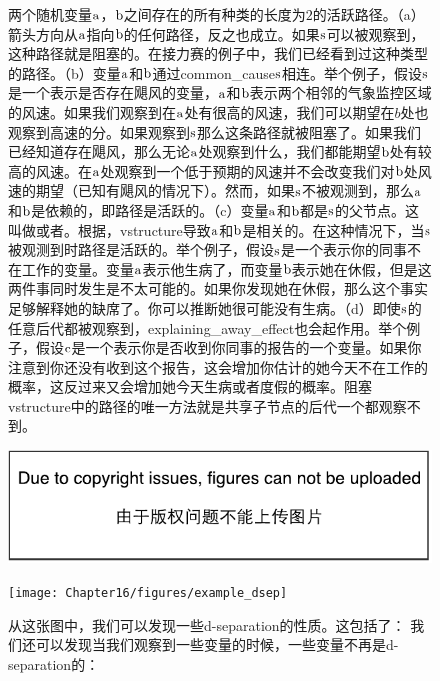 \begin{figure}[!htb]
	\caption{两个随机变量$\mathrm{a}$，$\mathrm{b}$之间存在的所有种类的长度为$2$的活跃路径。（a）箭头方向从$\mathrm{a}$指向$\mathrm{b}$的任何路径，反之也成立。如果$\mathrm{s}$可以被观察到，这种路径就是阻塞的。在接力赛的例子中，我们已经看到过这种类型的路径。（b）变量$\mathrm{a}$和$\mathrm{b}$通过\gls{common_cause}$\mathrm{s}$相连。举个例子，假设$\mathrm{s}$是一个表示是否存在飓风的变量，$\mathrm{a}$和$\mathrm{b}$表示两个相邻的气象监控区域的风速。如果我们观察到在$\mathrm{a}$处有很高的风速，我们可以期望在$b$处也观察到高速的分。如果观察到$\mathrm{s}$那么这条路径就被阻塞了。如果我们已经知道存在飓风，那么无论$\mathrm{a}$处观察到什么，我们都能期望$\mathrm{b}$处有较高的风速。在$\mathrm{a}$处观察到一个低于预期的风速并不会改变我们对$\mathrm{b}$处风速的期望（已知有飓风的情况下）。然而，如果$\mathrm{s}$不被观测到，那么$\mathrm{a}$和$\mathrm{b}$是依赖的，即路径是活跃的。（c）变量$\mathrm{a}$和$\mathrm{b}$都是$\mathrm{s}$的父节点。这叫做或者。根据，\gls{vstructure}导致$\mathrm{a}$和$\mathrm{b}$是相关的。在这种情况下，当$\mathrm{s}$被观测到时路径是活跃的。举个例子，假设$\mathrm{s}$是一个表示你的同事不在工作的变量。变量$\mathrm{a}$表示他生病了，而变量$\mathrm{b}$表示她在休假，但是这两件事同时发生是不太可能的。如果你发现她在休假，那么这个事实足够解释她的缺席了。你可以推断她很可能没有生病。（d）即使$\mathrm{s}$的任意后代都被观察到，\gls{explaining_away_effect}也会起作用。举个例子，假设$\mathrm{c}$是一个表示你是否收到你同事的报告的一个变量。如果你注意到你还没有收到这个报告，这会增加你估计的她今天不在工作的概率，这反过来又会增加她今天生病或者度假的概率。阻塞\gls{vstructure}中的路径的唯一方法就是共享子节点的后代一个都观察不到。}
	\label{fig:168}
\end{figure}

\begin{figure}[!htb]
\ifOpenSource
\centerline{\includegraphics{figure.pdf}}
\else
	\centerline{\texttt{[image: Chapter16/figures/example\_dsep]}}	
\fi
	\caption{从这张图中，我们可以发现一些d-\gls{separation}的性质。这包括了：
	我们还可以发现当我们观察到一些变量的时候，一些变量不再是d-\gls{separation}的：
	}
	\label{fig:169}
\end{figure}


